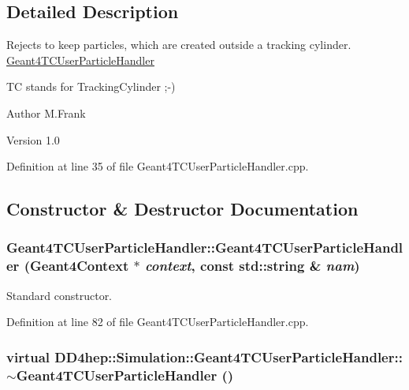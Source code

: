 \subsection{Detailed Description}
Rejects to keep particles, which are created outside a tracking cylinder. \hyperlink{class_d_d4hep_1_1_simulation_1_1_geant4_t_c_user_particle_handler}{Geant4TCUserParticleHandler}

TC stands for TrackingCylinder ;-\/)

\begin{DoxyAuthor}{Author}
M.Frank 
\end{DoxyAuthor}
\begin{DoxyVersion}{Version}
1.0 
\end{DoxyVersion}


Definition at line 35 of file Geant4TCUserParticleHandler.cpp.

\subsection{Constructor \& Destructor Documentation}
\hypertarget{class_d_d4hep_1_1_simulation_1_1_geant4_t_c_user_particle_handler_ab791641fc330c58512a0becaece51142}{
\subsubsection[{Geant4TCUserParticleHandler}]{\setlength{\rightskip}{0pt plus 5cm}Geant4TCUserParticleHandler::Geant4TCUserParticleHandler ({\bf Geant4Context} $\ast$ {\em context}, \/  const std::string \& {\em nam})}}
\label{class_d_d4hep_1_1_simulation_1_1_geant4_t_c_user_particle_handler_ab791641fc330c58512a0becaece51142}


Standard constructor. 

Definition at line 82 of file Geant4TCUserParticleHandler.cpp.\hypertarget{class_d_d4hep_1_1_simulation_1_1_geant4_t_c_user_particle_handler_adcf43ca266894019172cb24712daa9d0}{
\subsubsection[{$\sim$Geant4TCUserParticleHandler}]{\setlength{\rightskip}{0pt plus 5cm}virtual DD4hep::Simulation::Geant4TCUserParticleHandler::$\sim$Geant4TCUserParticleHandler ()}}
\label{class_d_d4hep_1_1_simulation_1_1_geant4_t_c_user_particle_handler_adcf43ca266894019172cb24712daa9d0}


